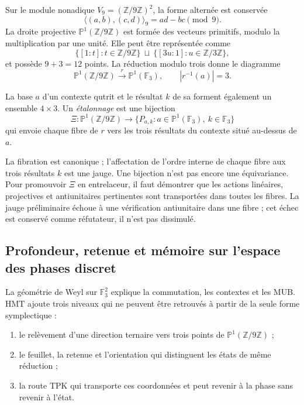 Sur le module nonadique $V_9=(\mathbb Z/9\mathbb Z)^2$, la forme
alternée est conservée
\[
 \langle(a,b),(c,d)\rangle_9=ad-bc\pmod9.
 \tag{GMC-5.5}
\]
La droite projective $\mathbb P^1(\mathbb Z/9\mathbb Z)$ est formée des
vecteurs primitifs, modulo la multiplication par une unité. Elle peut
être représentée comme
\[
 \{[1:t]:t\in\mathbb Z/9\mathbb Z\}
 \ \sqcup\ 
 \{[3u:1]:u\in\mathbb Z/3\mathbb Z\},
 \tag{GMC-5.6}
\]
et possède $9+3=12$ points. La réduction modulo trois donne le diagramme
\[
 \mathbb P^1(\mathbb Z/9\mathbb Z)
 \xrightarrow{\ r\ }
 \mathbb P^1(\mathbb F_3),
 \qquad |r^{-1}(a)|=3.
 \tag{GMC-5.7}
\]

La base $a$ d’un contexte qutrit et le résultat $k$ de sa \PVM
forment également un ensemble $4\times3$. Un \emph{étalonnage} est une bijection
\[
 \Xi:\mathbb P^1(\mathbb Z/9\mathbb Z)
 \longrightarrow
 \{P_{a,k}:a\in\mathbb P^1(\mathbb F_3),\ k\in\mathbb F_3\}
 \tag{GMC-5.8}
\]
qui envoie chaque fibre de $r$ vers les trois résultats du contexte situé au-dessus de
$a$.

\begin{controlbox}
La fibration est canonique ; l’affectation de l’ordre interne de chaque fibre aux
trois résultats $k$ est une jauge. Une bijection n’est pas encore une
équivariance. Pour promouvoir $\Xi$ en entrelaceur, il faut démontrer que les
actions linéaires, projectives et antiunitaires pertinentes sont transportées dans
toutes les fibres. La jauge préliminaire échoue à une vérification antiunitaire dans une
fibre ; cet échec est conservé comme réfutateur, il n’est pas dissimulé.
\end{controlbox}

\subsection{Profondeur, retenue et mémoire sur l’espace des phases discret}

La géométrie de Weyl sur $\mathbb F_3^2$ explique la commutation, les contextes et les
MUB. HMT ajoute trois niveaux qui ne peuvent être retrouvés à partir de la seule forme
symplectique :

\begin{enumerate}
 \item le relèvement d’une direction ternaire vers trois points de
 $\mathbb P^1(\mathbb Z/9\mathbb Z)$ ;
 \item le feuillet, la retenue et l’orientation qui distinguent les états de
 même réduction ;
 \item la route TPK qui transporte ces coordonnées et peut revenir à la
 phase sans revenir à l’état.
\end{enumerate}


